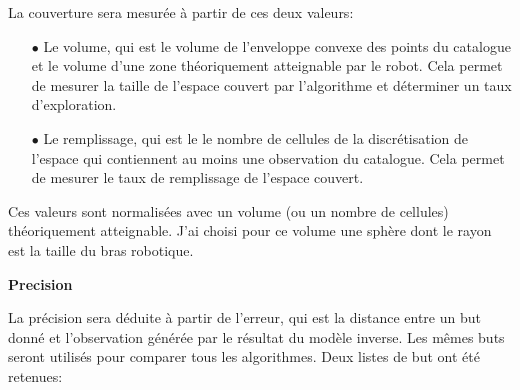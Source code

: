 \documentclass[11pt,french]{report}
\begin{document}
La couverture sera mesurée à partir de ces deux valeurs:

\begin{itemize}
    \item[$\bullet$] Le volume, qui est le volume de l'enveloppe convexe des points du catalogue et le volume d'une zone théoriquement atteignable par le robot.
    Cela permet de mesurer la taille de l'espace couvert par l'algorithme et déterminer un taux d'exploration.
    \item[$\bullet$] Le remplissage, qui est le le nombre de cellules de la discrétisation de l'espace qui contiennent au moins une observation du catalogue.
    Cela permet de mesurer le taux de remplissage de l'espace couvert.
\end{itemize}
Ces valeurs sont normalisées avec un volume (ou un nombre de cellules) théoriquement atteignable.
J'ai choisi pour ce volume une sphère dont le rayon est la taille du bras robotique.

\phantom{INVISIBLE LINE}

\textbf{Precision}

\phantom{INVISIBLE LINE}

La précision sera déduite à partir de l'erreur, qui est la distance entre un but donné et l'observation générée par le résultat du modèle inverse.
Les mêmes buts seront utilisés pour comparer tous les algorithmes.
Deux listes de but ont été retenues:
\end{document}
